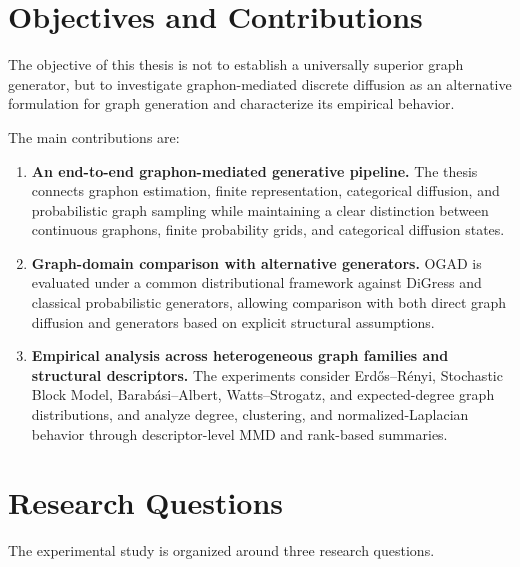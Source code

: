 \section{Objectives and Contributions}
\label{sec:intro_contributions}

The objective of this thesis is not to establish a universally superior graph generator, but to investigate graphon-mediated discrete diffusion as an alternative formulation for graph generation and characterize its empirical behavior.

The main contributions are:

\begin{enumerate}

    \item \textbf{An end-to-end graphon-mediated generative pipeline.} The thesis connects graphon estimation, finite representation, categorical diffusion, and probabilistic graph sampling while maintaining a clear distinction between continuous graphons, finite probability grids, and categorical diffusion states.

    \item \textbf{Graph-domain comparison with alternative generators.} OGAD is evaluated under a common distributional framework against DiGress and classical probabilistic generators, allowing comparison with both direct graph diffusion and generators based on explicit structural assumptions.

    \item \textbf{Empirical analysis across heterogeneous graph families and structural descriptors.} The experiments consider Erd\H{o}s--R\'enyi, Stochastic Block Model, Barab\'asi--Albert, Watts--Strogatz, and expected-degree graph distributions, and analyze degree, clustering, and normalized-Laplacian behavior through descriptor-level MMD and rank-based summaries.

\end{enumerate}


\section{Research Questions}
\label{sec:intro_research_questions}

The experimental study is organized around three research questions.

